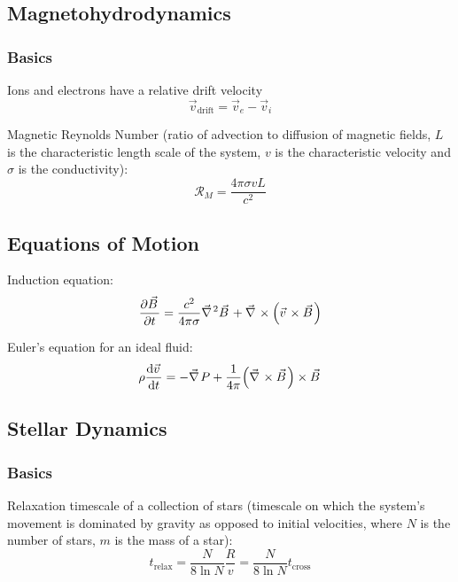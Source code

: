 	\subsection{Magnetohydrodynamics}
		\subsubsection{Basics}
			Ions and electrons have a relative drift velocity
			\begin{equation}
				\vec{v}_{\text{drift}} = \vec{v}_e - \vec{v}_i
			\end{equation}

			\noindent
			Magnetic Reynolds Number (ratio of advection to diffusion of magnetic fields, $L$ is the characteristic length scale of the system, $v$ is the characteristic velocity and $\sigma$ is the conductivity):
			\begin{equation}
				\mathcal{R}_M = \frac{4\pi\sigma v L}{c^2}
			\end{equation}

		\subsection{Equations of Motion}
			Induction equation:
			\begin{equation}
				\pdv{\vec{B}}{t} = \frac{c^2}{4\pi\sigma} \Nabla^2 \vec{B} + \Nabla\times\qty(\vec{v}\times\vec{B})
			\end{equation}

			\noindent
			Euler's equation for an ideal fluid:
			\begin{equation}
				\rho \dv{\vec{v}}{t} = - \Nabla P + \frac{1}{4\pi}\qty(\Nabla\times\vec{B})\times\vec{B}
			\end{equation}


	\subsection{Stellar Dynamics}
		\subsubsection{Basics}
			Relaxation timescale of a collection of stars (timescale on which the system's movement is dominated by gravity as opposed to initial velocities, where $N$ is the number of stars, $m$ is the mass of a star):
			\begin{equation}
				t_{\text{relax}} = \frac{N}{8\ln N} \frac{R}{v} = \frac{N}{8\ln N} t_{\text{cross}}
			\end{equation}


